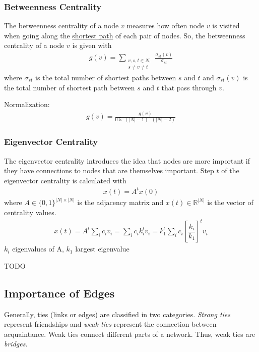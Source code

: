 \documentclass[english]{panikzettel}
\begin{document}
\subsubsection{Betweenness Centrality} \label{sec:betweenness_centrality}
The betweenness centrality of a node $ v $ measures how often node $ v $ is visited when going along the \hyperref[sec:distance]{shortest path} of each pair of nodes. 
So, the betweenness centrality of a node $ v $ is given with
\begin{align*}
	g(v) = \sum\limits_{\substack{v,s,t \in N,\\ s \neq v \neq t}} \frac{\sigma_{st}(v)}{\sigma_{st}} 
\end{align*}
where $ \sigma_{st} $ is the total number of shortest paths between $ s $ and $ t $ and $ \sigma_{st}(v) $ is the total number of shortest path between $ s $ and $ t $ that pass through $ v $.

Normalization:
\begin{align*}
	g(v) = \frac{g(v)}{0.5 \cdot (|N| -1) \cdot (|N| - 2)}
\end{align*}

\subsubsection{Eigenvector Centrality}
The eigenvector centrality introduces the idea that nodes are more important if they have connections to nodes that are themselves important. 
Step $ t $ of the eigenvector centrality is calculated with
\begin{align*}
	x(t) = A^t x(0)
\end{align*}
where $ A \in \{0,1\}^{|N|\times|N|}  $ is the adjacency matrix and $ x(t) \in \mathbb{R}^{|N|} $ is the vector of centrality values.
\begin{align*}
	x(t) = A^t \sum_i c_i v_i = \sum_i c_i k_i^t v_i = k_1^t \sum_i c_i \left[\dfrac{k_i}{k_1}\right]^t v_i
\end{align*}
$ k_i $ eigenvalues of A, $ k_1 $ largest eigenvalue

TODO

\subsection{Importance of Edges}
Generally, ties (links or edges) are classified in two categories. 
\textit{Strong ties} represent friendships and \textit{weak ties} represent the connection between acquaintance. 
Weak ties connect different parts of a network. 
Thus, weak ties are \textit{bridges}.
\end{document}
